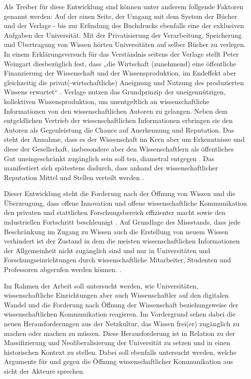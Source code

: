 Als Treiber für diese Entwicklung sind können unter anderem follgende Faktoren genannt werden: Auf der einen Seite, der Umgang mit dem System der Bücher und der Verlage - bis zur Erfindung des Buchdrucks ebenfalls eine der exklusiven Aufgaben der Universität. Mit der Privatisierung der Verarbeitung, Speicherung und Übertragung von Wissen hörten Universitäten auf selber Bücher zu verlegen. In einem Erklärungsversuch für das Verständnis seitens der Verlage stellt Peter Weingart diesbezüglich fest, dass „die Wirtschaft (zunehmend) eine öffentliche Finanzierung der Wissenschaft und der Wissensproduktion, im Endeffekt aber gleichzeitig die privat(-wirtschaftliche) Aneignung und Nutzung des produzierten Wissens erwartet“ \cite{cite:2}. Verlage nutzen das Grundprinzip der uneigennützigen, kollektiven Wissensproduktion, um unentgeltlich an wissenschaftliche Informationen von den wissenschaftlichen Autoren zu gelangen. Neben dem entgeldlichen Vertrieb der wissenschaftlichen Informationen erbringen sie den Autoren als Gegenleistung die Chance auf Anerkennung und Reputation. Das steht der Annahme, dass es der Wissenschaft im Kern aber um Erkenntnisse und diese der Gesellschaft, insbesondere aber den Wissenschaftlern als öffentliches Gut uneingeschränkt zugänglich sein soll ten\cite{hanekop_2006}, diametral entgegen \cite{offhaus_2012_institutionelle_repos}. Das manifestiert sich spätestens dadurch, dass anhand der wissenschaftlicher Reputation Mittel und Stellen verteilt werden \cite{cite:4}.

Dieser Entwicklung steht die Forderung nach der Öffnung von Wissen und die Überzeugung, dass offene Innovation und offene wissenschaftliche Kommunikation den privaten und stattlichen Forschungsbereich effizienter macht sowie den industriellen Fortschritt beschleunigt \cite{cite:7}. Auf Grundlage des Missstands, dass jede Beschränkung im Zugang zu Wissen auch die Erstellung von neuem Wissen verhindert \cite{cite:5} \cite{cite:8} ist der Zustand in dem die meisten wissenschaftlichen Informationen der Allgemeinheit nicht zugänglich sind und nur in Universitäten und Forschungseinrichtungen durch wissenschaftliche Mitarbeiter, Studenten und Professoren abgerufen werden können. \cite{cite:6}.

Im Rahmen der Arbeit soll untersucht werden, wie Universitäten, wissenschaftliche Einrichtungen aber auch Wissenschaftler auf den digitalen Wandel und die Forderung nach Öffnung der Wissenschaft beziehungsweise der wissenschaftlichen Kommunikation reagieren. Im Vordergrund sehen dabei die neuen Herausforderungen aus der Netzkultur, das Wissen frei(er) zugänglich zu machen oder machen zu müssen. Diese Herausforderung ist in Relation zu der Massifizierung und Neoliberalisierung der Universität zu setzen und in einen historischen Kontext zu stellen. Dabei soll ebenfalls untersucht werden, welche Argumente für und gegen die Öffnung wissenschaftlicher Kommunikation aus sicht der Akteure sprechen.

